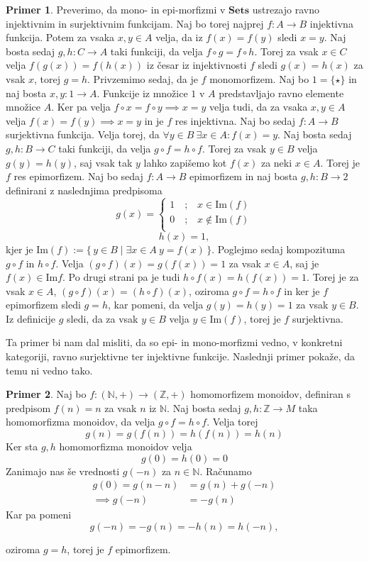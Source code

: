 \documentclass[12pt,a4paper]{book}
\theoremstyle{definition}
\theoremstyle{plain}
\theoremstyle{definition}
\newtheorem{primer}{Primer}[section]
\theoremstyle{remark}
\newcommand{\cat}[1]{\textbf{#1}}
\renewcommand{\set}[1]{\{\,#1\,\}}
\begin{document}
\begin{primer}
Preverimo, da mono- in epi-morfizmi v $\cat{Sets}$ ustrezajo ravno injektivnim in surjektivnim funkcijam. Naj bo torej najprej $f : A \to B$ injektivna funkcija. Potem za vsaka $x,y \in A$ velja, da iz $f(x) = f(y)$ sledi $x = y$. Naj bosta sedaj $g,h : C \to A$ taki funkciji, da velja $f \circ g = f \circ h$. Torej za vsak $x \in C$ velja $f(g(x)) = f(h(x))$ iz česar iz injektivnosti $f$ sledi $g(x) = h(x)$ za vsak $x$, torej $g = h$. 
Privzemimo sedaj, da je $f$ monomorfizem. Naj bo $1 = \{\star\}$ in naj bosta $x,y : 1 \to A$. Funkcije iz množice $1$ v $A$ predstavljajo ravno elemente množice $A$. Ker pa velja $f \circ x = f \circ y \implies x = y$ velja tudi, da za vsaka $x,y \in A$ velja $f(x) = f(y) \implies x = y$ in je $f$ res injektivna. Naj bo sedaj $f : A \rightarrow B$ surjektivna funkcija. Velja torej, da $\forall y \in B \ \exists x \in A : f(x) = y$. Naj bosta sedaj $g,h : B \to C$ taki funkciji, da velja $g \circ f = h \circ f$. Torej za vsak $y \in B$ velja $g(y) = h(y)$, saj vsak tak $y$ lahko zapišemo kot $f(x)$ za neki $x \in A$. Torej je $f$ res epimorfizem. Naj bo sedaj $f : A \to B$ epimorfizem in naj bosta $g,h : B \to 2$ definirani z naslednjima predpisoma
\[
g(x)=
\begin{cases}
1 \quad\text{;}\quad x \in \mathrm{Im}(f) \\
0 \quad\text{;}\quad x \notin \mathrm{Im}(f) \\
\end{cases}
\]
$$ h(x) = 1,$$
kjer je $\mathrm{Im}(f) := \set{y \in B \mid \exists x \in A \ y = f(x)}$.
Poglejmo sedaj kompozituma $g \circ f$ in $h \circ f$. Velja $(g \circ f)(x) = g(f(x)) = 1$ za vsak $x \in A$, saj je $f(x) \in \mathrm{Im}f$. Po drugi strani pa je tudi $h \circ f(x) = h(f(x)) = 1$. Torej je za vsak $x \in A$, $(g \circ f)(x) = (h \circ f)(x)$, oziroma $g\circ f = h\circ f$ in ker je $f$ epimorfizem sledi $g = h$, kar pomeni, da velja $g(y) = h(y) = 1$ za vsak $y \in B$. Iz definicije $g$ sledi, da za vsak $y \in B$ velja $y \in \mathrm{Im}(f)$, torej je $f$ surjektivna.
\end{primer}

Ta primer bi nam dal misliti, da so epi- in mono-morfizmi vedno, v konkretni kategoriji, ravno surjektivne ter injektivne funkcije. Naslednji primer pokaže, da temu ni vedno tako.

\begin{primer}
Naj bo $f : (\mathbb{N},+) \to (\mathbb{Z},+)$ homomorfizem monoidov, definiran s predpisom $f(n) = n$ za vsak $n$ iz $\mathbb{N}$. Naj bosta sedaj $g,h: \mathbb{Z} \to M$ taka homomorfizma monoidov, da velja $g \circ f = h \circ f$. 
Velja torej 
$$g(n) = g(f(n)) = h(f(n)) = h(n)$$
Ker sta $g,h$ homomorfizma monoidov velja
$$g(0) = h(0) = 0$$
Zanimajo nas še vrednosti $g(-n)$ za $n \in \mathbb{N}$. 
Računamo 
\begin{align*}
g(0) = g(n - n) &= g(n) + g(-n) \\
\implies g(-n) &= -g(n)
\end{align*}
Kar pa pomeni
$$g(-n) = -g(n) = -h(n) = h(-n),$$

oziroma $g = h$, torej je $f$ epimorfizem.
\end{primer}
\end{document}
